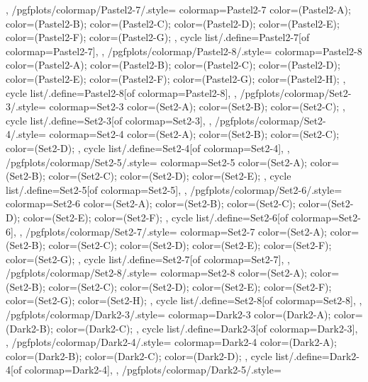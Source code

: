 {{  },
  /pgfplots/colormap/Pastel2-7/.style={
    colormap={Pastel2-7}{
      color=(Pastel2-A);
      color=(Pastel2-B);
      color=(Pastel2-C);
      color=(Pastel2-D);
      color=(Pastel2-E);
      color=(Pastel2-F);
      color=(Pastel2-G);
    },
    cycle list/.define={Pastel2-7}{[of colormap=Pastel2-7]},
  },
  /pgfplots/colormap/Pastel2-8/.style={
    colormap={Pastel2-8}{
      color=(Pastel2-A);
      color=(Pastel2-B);
      color=(Pastel2-C);
      color=(Pastel2-D);
      color=(Pastel2-E);
      color=(Pastel2-F);
      color=(Pastel2-G);
      color=(Pastel2-H);
    },
    cycle list/.define={Pastel2-8}{[of colormap=Pastel2-8]},
  },
  /pgfplots/colormap/Set2-3/.style={
    colormap={Set2-3}{
      color=(Set2-A);
      color=(Set2-B);
      color=(Set2-C);
    },
    cycle list/.define={Set2-3}{[of colormap=Set2-3]},
  },
  /pgfplots/colormap/Set2-4/.style={
    colormap={Set2-4}{
      color=(Set2-A);
      color=(Set2-B);
      color=(Set2-C);
      color=(Set2-D);
    },
    cycle list/.define={Set2-4}{[of colormap=Set2-4]},
  },
  /pgfplots/colormap/Set2-5/.style={
    colormap={Set2-5}{
      color=(Set2-A);
      color=(Set2-B);
      color=(Set2-C);
      color=(Set2-D);
      color=(Set2-E);
    },
    cycle list/.define={Set2-5}{[of colormap=Set2-5]},
  },
  /pgfplots/colormap/Set2-6/.style={
    colormap={Set2-6}{
      color=(Set2-A);
      color=(Set2-B);
      color=(Set2-C);
      color=(Set2-D);
      color=(Set2-E);
      color=(Set2-F);
    },
    cycle list/.define={Set2-6}{[of colormap=Set2-6]},
  },
  /pgfplots/colormap/Set2-7/.style={
    colormap={Set2-7}{
      color=(Set2-A);
      color=(Set2-B);
      color=(Set2-C);
      color=(Set2-D);
      color=(Set2-E);
      color=(Set2-F);
      color=(Set2-G);
    },
    cycle list/.define={Set2-7}{[of colormap=Set2-7]},
  },
  /pgfplots/colormap/Set2-8/.style={
    colormap={Set2-8}{
      color=(Set2-A);
      color=(Set2-B);
      color=(Set2-C);
      color=(Set2-D);
      color=(Set2-E);
      color=(Set2-F);
      color=(Set2-G);
      color=(Set2-H);
    },
    cycle list/.define={Set2-8}{[of colormap=Set2-8]},
  },
  /pgfplots/colormap/Dark2-3/.style={
    colormap={Dark2-3}{
      color=(Dark2-A);
      color=(Dark2-B);
      color=(Dark2-C);
    },
    cycle list/.define={Dark2-3}{[of colormap=Dark2-3]},
  },
  /pgfplots/colormap/Dark2-4/.style={
    colormap={Dark2-4}{
      color=(Dark2-A);
      color=(Dark2-B);
      color=(Dark2-C);
      color=(Dark2-D);
    },
    cycle list/.define={Dark2-4}{[of colormap=Dark2-4]},
  },
  /pgfplots/colormap/Dark2-5/.style={
}}
